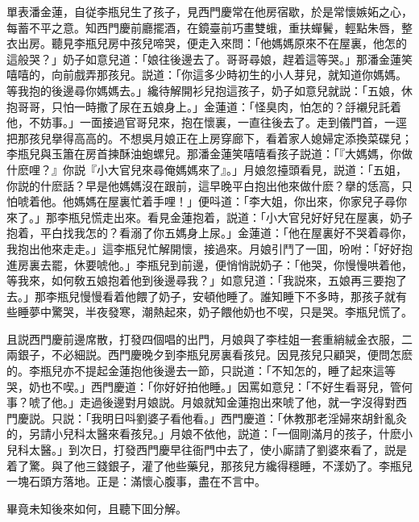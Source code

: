 單表潘金蓮，自従李瓶兒生了孩子，見西門慶常在他房宿歇，於是常懷嫉妬之心，每蓄不平之意。知西門慶前廳擺酒，在鏡臺前巧畫雙蛾，重扶蟬鬢，輕點朱唇，整衣出房。聽見李瓶兒房中孩兒啼哭，便走入來問：「他媽媽原來不在屋裏，他怎的這般哭？」奶子如意兒道：「娘往後邊去了。哥哥尋娘，趕着這等哭。」那潘金蓮笑嘻嘻的，向前戲弄那孩兒。説道：「你這多少時初生的小人芽兒，就知道你媽媽。等我抱的後邊尋你媽媽去。」纔待解開衫兒抱這孩子，奶子如意兒就説：「五娘，休抱哥哥，只怕一時撒了尿在五娘身上。」金蓮道：「怪臭肉，怕怎的？㧱襯兒託着他，不妨事。」一面接過官哥兒來，抱在懷裏，一直往後去了。走到儀門首，一逕把那孩兒擧得高高的。不想吳月娘正在上房穿廊下，看着家人媳婦定添換菜碟兒；李瓶兒與玉簫在房首揀酥油蚫螺兒。那潘金蓮笑嘻嘻看孩子説道：「『大媽媽，你做什麽哩？』你説『小大官兒來尋俺媽媽來了』。」月娘忽擡頭看見，説道：「五姐，你説的什麽話？早是他媽媽沒在跟前，這早晚平白抱出他來做什麽？擧的恁高，只怕唬着他。他媽媽在屋裏忙着手哩！」便呌道：「李大姐，你出來，你家兒子尋你來了。」那李瓶兒慌走出來。看見金蓮抱着，説道：「小大官兒好好兒在屋裏，奶子抱着，平白找我怎的？看溺了你五媽身上尿。」金蓮道：「他在屋裏好不哭着尋你，我抱出他來走走。」這李瓶兒忙解開懷，接過來。月娘引鬥了一囬，吩咐：「好好抱進房裏去罷，休要唬他。」李瓶兒到前邊，便悄悄説奶子：「他哭，你慢慢哄着他，等我來，如何敎五娘抱着他到後邊尋我？」如意兒道：「我説來，五娘再三要抱了去。」那李瓶兒慢慢看着他餵了奶子，安頓他睡了。誰知睡下不多時，那孩子就有些睡夢中驚哭，半夜發寒，潮熱起來，奶子餵他奶也不喫，只是哭。李瓶兒慌了。

且説西門慶前邊席散，打發四個唱的出門，月娘與了李桂姐一套重綃絨金衣服，二兩銀子，不必細説。西門慶晚夕到李瓶兒房裏看孩兒。因見孩兒只顧哭，便問怎麽的。李瓶兒亦不提起金蓮抱他後邊去一節，只説道：「不知怎的，睡了起來這等哭，奶也不喫。」西門慶道：「你好好拍他睡。」因罵如意兒：「不好生看哥兒，管何事？唬了他。」走過後邊對月娘説。月娘就知金蓮抱出來唬了他，就一字沒得對西門慶説。只説：「我明日呌劉婆子看他看。」西門慶道：「休教那老淫婦來胡針亂灸的，另請小兒科太醫來看孩兒。」月娘不依他，説道：「一個剛滿月的孩子，什麽小兒科太醫。」到次日，打發西門慶早往衙門中去了，使小廝請了劉婆來看了，説是着了驚。與了他三錢銀子，灌了他些藥兒，那孩兒方纔得穩睡，不漾奶了。李瓶兒一塊石頭方落地。正是：滿懷心腹事，盡在不言中。

畢竟未知後來如何，且聽下囬分解。

